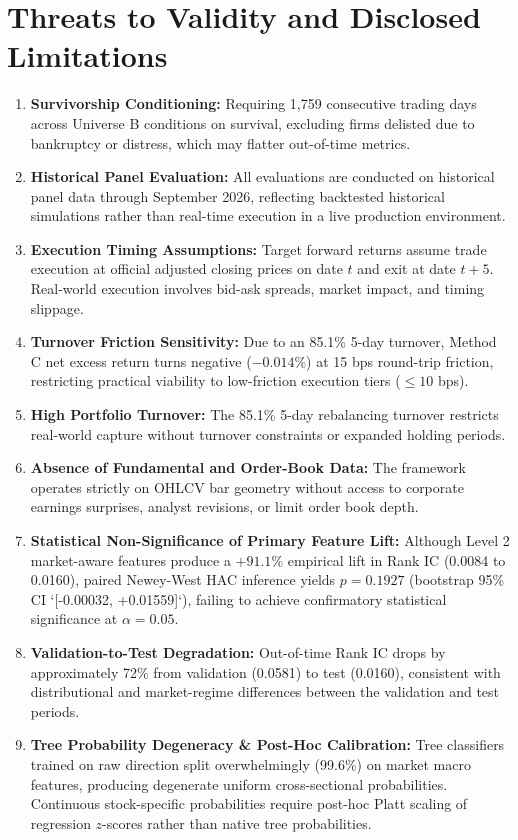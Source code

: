 \documentclass[11pt,a4paper]{article}
\begin{document}
\section{Threats to Validity and Disclosed Limitations}
\begin{enumerate}
    \item \textbf{Survivorship Conditioning:} Requiring 1,759 consecutive trading days across Universe B conditions on survival, excluding firms delisted due to bankruptcy or distress, which may flatter out-of-time metrics.
    \item \textbf{Historical Panel Evaluation:} All evaluations are conducted on historical panel data through September 2026, reflecting backtested historical simulations rather than real-time execution in a live production environment.
    \item \textbf{Execution Timing Assumptions:} Target forward returns assume trade execution at official adjusted closing prices on date $t$ and exit at date $t+5$. Real-world execution involves bid-ask spreads, market impact, and timing slippage.
    \item \textbf{Turnover Friction Sensitivity:} Due to an 85.1\% 5-day turnover, Method C net excess return turns negative ($-0.014\%$) at 15 bps round-trip friction, restricting practical viability to low-friction execution tiers ($\le 10$ bps).
    \item \textbf{High Portfolio Turnover:} The 85.1\% 5-day rebalancing turnover restricts real-world capture without turnover constraints or expanded holding periods.
    \item \textbf{Absence of Fundamental and Order-Book Data:} The framework operates strictly on OHLCV bar geometry without access to corporate earnings surprises, analyst revisions, or limit order book depth.
    \item \textbf{Statistical Non-Significance of Primary Feature Lift:} Although Level 2 market-aware features produce a $+91.1\%$ empirical lift in Rank IC (0.0084 to 0.0160), paired Newey-West HAC inference yields $p = 0.1927$ (bootstrap 95\% CI `[-0.00032, +0.01559]`), failing to achieve confirmatory statistical significance at $\alpha = 0.05$.
    \item \textbf{Validation-to-Test Degradation:} Out-of-time Rank IC drops by approximately 72\% from validation (0.0581) to test (0.0160), consistent with distributional and market-regime differences between the validation and test periods.
    \item \textbf{Tree Probability Degeneracy \& Post-Hoc Calibration:} Tree classifiers trained on raw direction split overwhelmingly (99.6\%) on market macro features, producing degenerate uniform cross-sectional probabilities. Continuous stock-specific probabilities require post-hoc Platt scaling of regression $z$-scores rather than native tree probabilities.
\end{enumerate}
\end{document}
